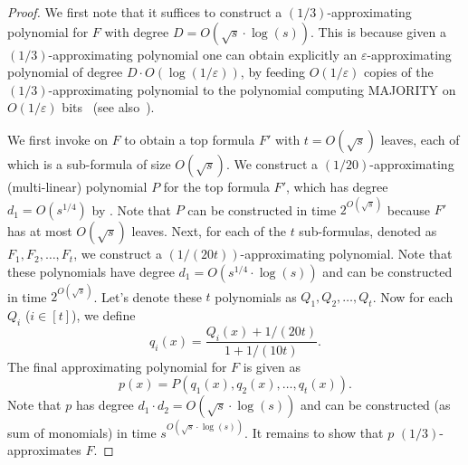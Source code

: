 	\begin{proof}
	    We first note that it suffices to construct a $(1/3)$-approximating polynomial for $F$ with degree $D=O(\sqrt{s}\cdot\log(s))$. This is because given a $(1/3)$-approximating polynomial one can obtain explicitly an $\varepsilon$-approximating polynomial of degree $D\cdot O(\log(1/\varepsilon))$, by feeding $O(1/\varepsilon)$ copies of the $(1/3)$-approximating polynomial to the polynomial computing MAJORITY on $O(1/\varepsilon)$ bits~\cite{BNRdW07} (see also~{\cite[Appendix B]{Tal14}}).
	    
	    We first invoke  on $F$ to obtain a top formula $F'$ with $t=O(\sqrt{s})$ leaves, each of which is a sub-formula of size $O(\sqrt{s})$. We construct a $(1/20)$-approximating (multi-linear) polynomial $P$ for the top formula $F'$, which has degree $d_1=O(s^{1/4})$ by . Note that $P$ can be constructed in time $2^{O(\sqrt{s})}$ because $F'$ has at most $O(\sqrt{s})$ leaves. Next, for each of the $t$ sub-formulas, denoted as $F_1,F_2,\dots,F_t$, we construct a $(1/(20t))$-approximating polynomial. Note that these polynomials have degree $d_1=O(s^{1/4}\cdot\log(s))$ and can be constructed in time $2^{O(\sqrt{s})}$. Let's denote these $t$ polynomials as $Q_1, Q_2,\dots,Q_{t}$. Now for each $Q_i$ ($i\in[t]$), we define
	    \[
	        q_i(x)=\frac{Q_i(x)+1/(20t)}{1+1/(10t)}.
	    \]
	    The final approximating polynomial for $F$ is given as
	    \[
	        p(x)=P\left(q_1(x),q_2(x),\dots,q_t(x)\right).
	    \]
	    Note that $p$ has degree $d_1\cdot d_2=O(\sqrt{s}\cdot\log(s))$ and can be constructed (as sum of monomials) in time $s^{O(\sqrt{s}\cdot\log(s))}$. It remains to show that $p$ $(1/3)$-approximates $F$.
	    

\end{proof}
